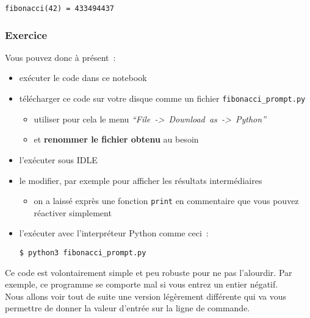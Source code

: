     \begin{Verbatim}[commandchars=\\\{\}]
fibonacci(42) = 433494437

    \end{Verbatim}

    \hypertarget{exercice}{%
\subsubsection{Exercice}\label{exercice}}

    Vous pouvez donc à présent~:

\begin{itemize}
\item
  exécuter le code dans ce notebook
\item
  télécharger ce code sur votre disque comme un fichier
  \texttt{fibonacci\_prompt.py}

  \begin{itemize}
  \tightlist
  \item
    utiliser pour cela le menu
    \emph{``File~-\textgreater{}~Download~as~-\textgreater{}~Python''}
  \item
    et \textbf{renommer le fichier obtenu} au besoin
  \end{itemize}
\item
  l'exécuter sous IDLE
\item
  le modifier, par exemple pour afficher les résultats intermédiaires

  \begin{itemize}
  \tightlist
  \item
    on a laissé exprès une fonction \texttt{print} en commentaire que
    vous pouvez réactiver simplement
  \end{itemize}
\item
  l'exécuter avec l'interpréteur Python comme ceci~:

  \texttt{\$\ python3\ fibonacci\_prompt.py}
\end{itemize}

    Ce code est volontairement simple et peu robuste pour ne pas l'alourdir.
Par exemple, ce programme se comporte mal si vous entrez un entier
négatif.\\

    Nous allons voir tout de suite une version légèrement différente qui va
vous permettre de donner la valeur d'entrée sur la ligne de commande.